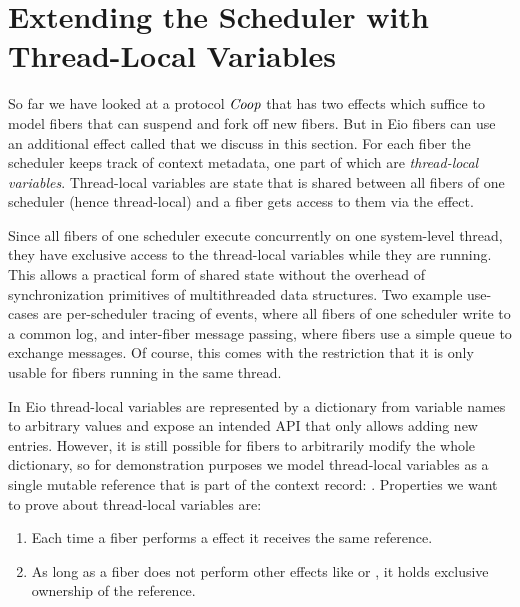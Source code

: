 \section{Extending the Scheduler with Thread-Local Variables}
\label{sec:thread-local-vars}


So far we have looked at a protocol \(\emph{Coop}{}\) that has two effects which suffice to model fibers that can suspend and fork off new fibers.
But in Eio fibers can use an additional effect called \egetctx{} that we discuss in this section.
For each fiber the scheduler keeps track of context metadata, one part of which are \emph{thread-local variables}.
Thread-local variables are state that is shared between all fibers of one scheduler (hence thread-local) and a fiber gets access to them via the \egetctx{} effect.


Since all fibers of one scheduler execute concurrently on one system-level thread, they have exclusive access to the thread-local variables while they are running.
This allows a practical form of shared state without the overhead of synchronization primitives of multithreaded data structures.
Two example use-cases are per-scheduler tracing of events, where all fibers of one scheduler write to a common log,
and inter-fiber message passing, where fibers use a simple queue to exchange messages.
Of course, this comes with the restriction that it is only usable for fibers running in the same thread.


In Eio thread-local variables are represented by a dictionary from variable names to arbitrary values and expose an intended API that only allows adding new entries.
However, it is still possible for fibers to arbitrarily modify the whole dictionary, so for demonstration purposes we model thread-local variables as a single mutable reference that is part of the context record: .
Properties we want to prove about thread-local variables are:
\begin{enumerate}
  \item Each time a fiber performs a \egetctx{} effect it receives the same reference.
  \item As long as a fiber does not perform other effects like \efork{} or \esuspend{}, it holds exclusive ownership of the reference.
\end{enumerate}

